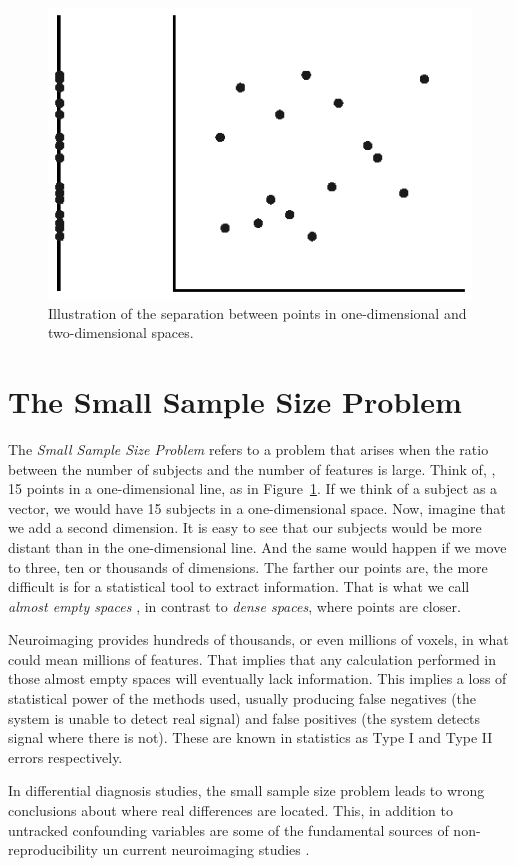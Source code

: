 \begin{figure}
\centering
\includegraphics[width=0.6\linewidth]{Graphics/ch1/smallsample}
\caption[Illustration of one and two-dimensional spaces.]{Illustration of the separation between points in one-dimensional and two-dimensional spaces.}
\label{fig:smallsample}
\end{figure}


\section{The Small Sample Size Problem}\label{sec:smallsamplesize}
The \textit{Small Sample Size Problem} refers to a problem that arises when the ratio between the number of subjects and the number of features is large. Think of, \eg, 15 points in a one-dimensional line, as in Figure~\ref{fig:smallsample}. If we think of a subject as a vector, we would have 15 subjects in a one-dimensional space. Now, imagine that we add a second dimension. It is easy to see that our subjects would be more distant than in the one-dimensional line. And the same would happen if we move to three, ten or thousands of dimensions. The farther our points are, the more difficult is for a statistical tool to extract information. That is what we call \textit{almost empty spaces} \cite{Duin2000,Stoeckel04}, in contrast to \textit{dense spaces}, where points are closer. 

Neuroimaging provides hundreds of thousands, or even millions of voxels, in what could mean millions of features. That implies that any calculation performed in those almost empty spaces will eventually lack information. This implies a loss of statistical power of the methods used, usually producing false negatives (the system is unable to detect real signal) and false positives (the system detects signal where there is not). These are known in statistics as Type I and Type II errors respectively. 

In differential diagnosis studies, the small sample size problem leads to wrong conclusions about where real differences are located. This, in addition to untracked confounding variables are some of the fundamental sources of non-re\-pro\-du\-ci\-bi\-li\-ty un current neuroimaging studies \cite{Button2013}. 

